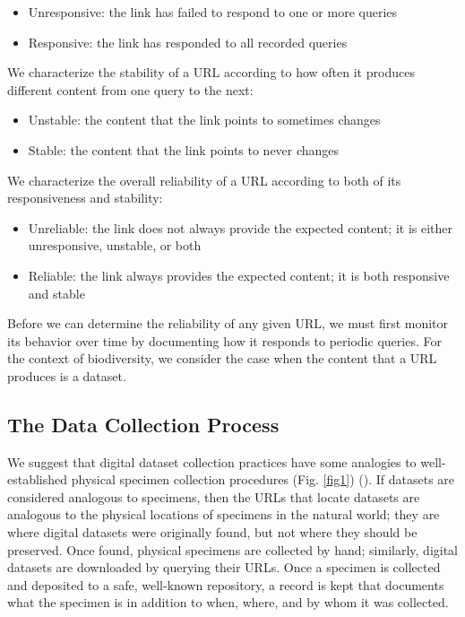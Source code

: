 \documentclass[12pt,letterpaper]{article}
\begin{document}
\begin{itemize}
    \item Unresponsive: the link has failed to respond to one or more queries
    \item Responsive: the link has responded to all recorded queries
\end{itemize}

We characterize the stability of a URL according to how often it produces different content from one query to the next:

\begin{itemize}
    \item Unstable: the content that the link points to sometimes changes
    \item Stable: the content that the link points to never changes
\end{itemize}

We characterize the overall reliability of a URL according to both of its responsiveness and stability:

\begin{itemize}
    \item Unreliable: the link does not always provide the expected content; it is either unresponsive, unstable, or both 
    \item Reliable: the link always provides the expected content; it is both responsive and stable
\end{itemize}

Before we can determine the reliability of any given URL, we must first monitor its behavior over time by documenting how it responds to periodic queries. For the context of biodiversity, we consider the case when the content that a URL produces is a dataset.

\subsection*{The Data Collection Process}

We suggest that digital dataset collection practices have some analogies to well-established physical specimen collection procedures (Fig. \ref{fig1}) (\cite{Poelen_2019}). If datasets are considered analogous to specimens, then the URLs that locate datasets are analogous to the physical locations of specimens in the natural world; they are where digital datasets were originally found, but not where they should be preserved. Once found, physical specimens are collected by hand; similarly, digital datasets are downloaded by querying their URLs. Once a specimen is collected and deposited to a safe, well-known repository, a record is kept that documents what the specimen is in addition to when, where, and by whom it was collected. 
\end{document}
